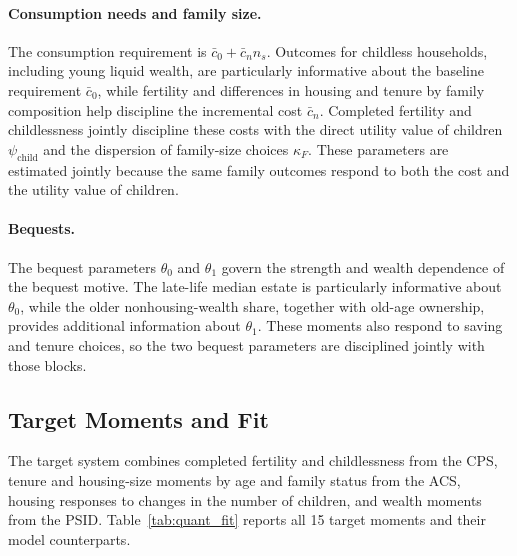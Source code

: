 \paragraph{Consumption needs and family size.}
The consumption requirement is $\bar c_0+\bar c_n n_s$. Outcomes for childless
households, including young liquid wealth, are particularly informative about
the baseline requirement $\bar c_0$, while fertility and differences in housing
and tenure by family composition help discipline the incremental cost
$\bar c_n$. Completed fertility and childlessness jointly discipline these
costs with the direct utility value of children $\psi_{\mathrm{child}}$ and the
dispersion of family-size choices $\kappa_F$. These parameters are estimated
jointly because the same family outcomes respond to both the cost and the
utility value of children.

\paragraph{Bequests.}
The bequest parameters $\theta_0$ and $\theta_1$ govern the strength and wealth
dependence of the bequest motive. The late-life median estate is particularly
informative about $\theta_0$, while the older nonhousing-wealth share, together
with old-age ownership, provides additional information about $\theta_1$.
These moments also respond to saving and tenure choices, so the two bequest
parameters are disciplined jointly with those blocks.

\subsection{Target Moments and Fit}

The target system combines completed fertility and childlessness from the CPS,
tenure and housing-size moments by age and family status from the ACS,
housing responses to changes in the number of children, and wealth moments
from the PSID. Table~\ref{tab:quant_fit} reports all 15 target moments and their
model counterparts.

